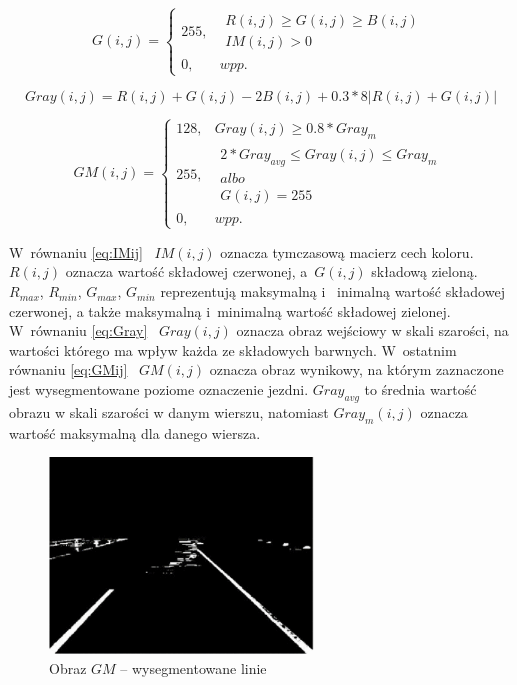 \begin{equation}
\label{eq:Gij}
G(i,j)=\left\{\begin{matrix}
255, & \begin{matrix}
R(i,j)\geq G(i,j) \geq B(i,j)\\ 
IM(i,j)>0
\end{matrix}\\ 
0, & wpp.
\end{matrix}\right.
\end{equation}

\begin{equation}
\label{eq:Gray}
Gray(i,j)=R(i,j)+G(i,j)-2B(i,j)+0.3*8|R(i,j)+G(i,j)|
\end{equation}

\begin{equation}
\label{eq:GMij}
GM(i,j)=\left\{\begin{matrix}
128, &  Gray(i,j)\geq 0.8*Gray_{m} \\ 
255, & \begin{matrix}
2*Gray_{avg} \leq Gray(i, j) \leq Gray_{m}\\albo\\ 
G(i,j)=255
\end{matrix} \\ 
0,   & wpp.
\end{matrix}\right.
\end{equation}

W~równaniu \eqref{eq:IMij} \ ${IM(i,j)}$ oznacza tymczasową macierz cech koloru. ${R(i,j)}$ oznacza wartość składowej czerwonej, a~${G(i,j)}$ składową zieloną. 
${R_{max}}$, ${R_{min}}$, ${G_{max}}$, ${G_{min}}$ reprezentują maksymalną i ~inimalną wartość składowej czerwonej, a także maksymalną i~minimalną wartość składowej zielonej. 
W~równaniu \eqref{eq:Gray} \ $ Gray(i,j)$ oznacza obraz wejściowy w skali szarości, na wartości którego ma wpływ każda ze składowych barwnych. 
W~ostatnim równaniu \eqref{eq:GMij} \ $GM(i,j)$ oznacza obraz wynikowy, na którym zaznaczone jest wysegmentowane poziome oznaczenie jezdni. 
$Gray_{avg}$ to średnia wartość obrazu w skali szarości w danym wierszu, natomiast $Gray_{m}(i,j)$ oznacza wartość maksymalną dla danego wiersza.

\begin{figure}
  \centering
  \includegraphics[width=7cm]{img/segmentacja.png}
  \caption{Obraz $GM$ -- wysegmentowane linie\cite{T3}}
  \label{fig:segmented}
\end{figure}


